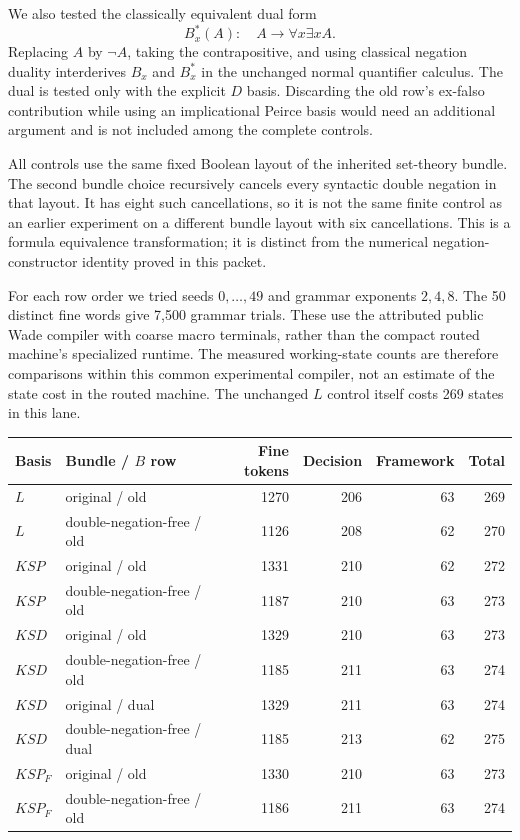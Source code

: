 We also tested the classically equivalent dual form
\[
 B_x^*(A):\quad A\to\forall x\exists x A.
\]
Replacing $A$ by $\neg A$, taking the contrapositive, and using classical
negation duality interderives $B_x$ and $B_x^*$ in the unchanged normal
quantifier calculus.  The dual is tested only with the explicit $D$ basis.
Discarding the old row's ex-falso contribution while using an implicational
Peirce basis would need an additional argument and is not included among
the complete controls.

All controls use the same fixed Boolean layout of the inherited set-theory
bundle.  The second bundle choice recursively cancels every syntactic
double negation in that layout.  It has eight such cancellations, so it is
not the same finite control as an earlier experiment on a different bundle
layout with six cancellations.  This is a formula equivalence transformation;
it is distinct from the numerical negation-constructor identity proved in
this packet.

For each row order we tried seeds $0,\ldots,49$ and grammar exponents
$2,4,8$.  The 50 distinct fine words give 7,500 grammar trials.  These use
the attributed public Wade compiler with coarse macro terminals, rather
than the compact routed machine's specialized runtime.  The measured
working-state counts are therefore comparisons within this common
experimental compiler, not an estimate of the state cost in the routed
machine.  The unchanged $L$ control itself costs 269 states in this lane.

\begin{center}
\small
\begin{tabular}{llrrrr}
\hline
Basis & Bundle / $B$ row & Fine tokens & Decision & Framework & Total\\
\hline
$L$ & original / old & 1270 & 206 & 63 & 269\\
$L$ & double-negation-free / old & 1126 & 208 & 62 & 270\\
$KSP$ & original / old & 1331 & 210 & 62 & 272\\
$KSP$ & double-negation-free / old & 1187 & 210 & 63 & 273\\
$KSD$ & original / old & 1329 & 210 & 63 & 273\\
$KSD$ & double-negation-free / old & 1185 & 211 & 63 & 274\\
$KSD$ & original / dual & 1329 & 211 & 63 & 274\\
$KSD$ & double-negation-free / dual & 1185 & 213 & 62 & 275\\
$KSP_F$ & original / old & 1330 & 210 & 63 & 273\\
$KSP_F$ & double-negation-free / old & 1186 & 211 & 63 & 274\\
\hline
\end{tabular}
\end{center}

